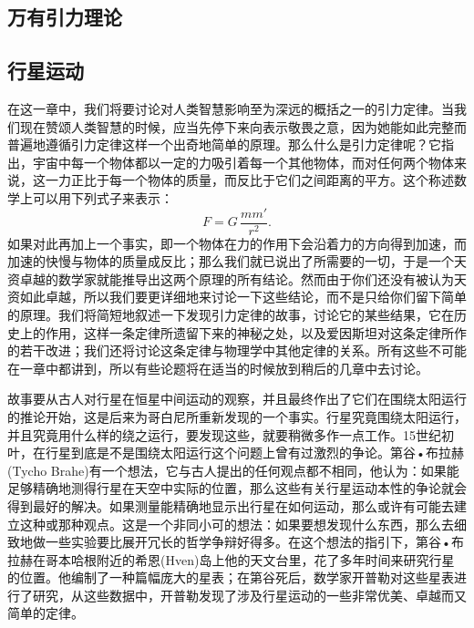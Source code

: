 \documentclass[12pt,oneside]{book}
\begin{document}
\begin{common-format}
\mainmatter

\setcounter{chapter}{6}
\chapter{万有引力理论}
\section{行星运动}
在这一章中，我们将要讨论对人类智慧影响至为深远的概括之一的引力定律。当我们现在赞颂人类智慧的时候，应当先停下来向表示敬畏之意，因为她能如此完整而普遍地遵循引力定律这样一个出奇地简单的原理。那么什么是引力定律呢？它指出，宇宙中每一个物体都以一定的力吸引着每一个其他物体，而对任何两个物体来说，这一力正比于每一个物体的质量，而反比于它们之间距离的平方。这个称述数学上可以用下列式子来表示：
\begin{equation*}
F=G\,\frac{mm'}{r^2}.
\end{equation*}
如果对此再加上一个事实，即一个物体在力的作用下会沿着力的方向得到加速，而加速的快慢与物体的质量成反比；那么我们就已说出了所需要的一切，于是一个天资卓越的数学家就能推导出这两个原理的所有结论。然而由于你们还没有被认为天资如此卓越，所以我们要更详细地来讨论一下这些结论，而不是只给你们留下简单的原理。我们将简短地叙述一下发现引力定律的故事，讨论它的某些结果，它在历史上的作用，这样一条定律所遗留下来的神秘之处，以及爱因斯坦对这条定律所作的若干改进；我们还将讨论这条定律与物理学中其他定律的关系。所有这些不可能在一章中都讲到，所以有些论题将在适当的时候放到稍后的几章中去讨论。

故事要从古人对行星在恒星中间运动的观察，并且最终作出了它们在围绕太阳运行的推论开始，这是后来为哥白尼所重新发现的一个事实。行星究竟围绕太阳运行，并且究竟用什么样的绕之运行，要发现这些，就要稍微多作一点工作。15世纪初叶，在行星到底是不是围绕太阳运行这个问题上曾有过激烈的争论。第谷•布拉赫(Tycho Brahe)有一个想法，它与古人提出的任何观点都不相同，他认为：如果能足够精确地测得行星在天空中实际的位置，那么这些有关行星运动本性的争论就会得到最好的解决。如果测量能精确地显示出行星在如何运动，那么或许有可能去建立这种或那种观点。这是一个非同小可的想法：如果要想发现什么东西，那么去细致地做一些实验要比展开冗长的哲学争辩好得多。在这个想法的指引下，第谷•布拉赫在哥本哈根附近的希恩(Hven)岛上他的天文台里，花了多年时间来研究行星的位置。他编制了一种篇幅庞大的星表；在第谷死后，数学家开普勒对这些星表进行了研究，从这些数据中，开普勒发现了涉及行星运动的一些非常优美、卓越而又简单的定律。




\end{common-format}
\end{document}

